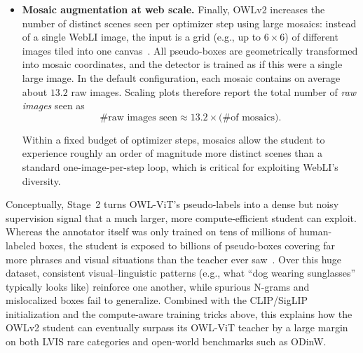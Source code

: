 \begin{enrichment}
\begin{enrichment}
\begin{enumerate}
\begin{itemize}
				During training, only the top-$K$ tokens (typically a small fraction of the retained tokens) ranked by objectness are passed through the full open-vocabulary classification head and incur the expensive dot-product loss against all queries in $\mathcal{Q}(x)$; the box head itself remains dense and is applied to all tokens.
				Tokens with low objectness are treated as background and bypass the classification head.
				
				Objectness is learned jointly with detection: tokens that are repeatedly associated with pseudo-boxes are encouraged to have high objectness, creating a self-reinforcing mechanism that focuses compute on object-like regions.
				This strategy focuses computation where objects are likely to appear and largely decouples the training cost from the size of the text vocabulary~\cite{minderer2024_owlvitv2}.
				
				\item \textbf{Mosaic augmentation at web scale.}
				Finally, OWLv2 increases the number of distinct scenes seen per optimizer step using large mosaics: instead of a single WebLI image, the input is a grid (e.g., up to $6\times 6$) of different images tiled into one canvas~\cite{ghiasi2021_simplecopypaste,minderer2024_owlvitv2}.
				All pseudo-boxes are geometrically transformed into mosaic coordinates, and the detector is trained as if this were a single large image.
				In the default configuration, each mosaic contains on average about $13.2$ raw images.
				Scaling plots therefore report the total number of \emph{raw images} seen as
				\[
				\text{\# raw images seen}
				\approx
				13.2 \times \text{(\# of mosaics)}.
				\]
				
				\newpage
				
				Within a fixed budget of optimizer steps, mosaics allow the student to experience roughly an order of magnitude more distinct scenes than a standard one-image-per-step loop, which is critical for exploiting WebLI’s diversity.
			\end{itemize}
			
			\medskip
			\noindent
			Conceptually, Stage~2 turns OWL-ViT’s pseudo-labels into a dense but noisy supervision signal that a much larger, more compute-efficient student can exploit.
			Whereas the annotator itself was only trained on tens of millions of human-labeled boxes, the student is exposed to billions of pseudo-boxes covering far more phrases and visual situations than the teacher ever saw~\cite{minderer2024_owlvitv2}.
			Over this huge dataset, consistent visual–linguistic patterns (e.g., what ``dog wearing sunglasses'' typically looks like) reinforce one another, while spurious N-grams and mislocalized boxes fail to generalize.
			Combined with the CLIP/SigLIP initialization and the compute-aware training tricks above, this explains how the OWLv2 student can eventually surpass its OWL-ViT teacher by a large margin on both LVIS rare categories and open-world benchmarks such as ODinW.
			

\end{enumerate}
\end{enrichment}
\end{enrichment}
